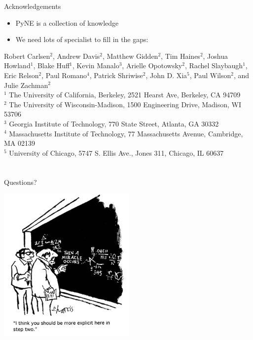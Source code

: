 \documentclass[xcolor=x11names,compress]{beamer}
\renewcommand{\(}{\begin{columns}}
\renewcommand{\)}{\end{columns}}
\newcommand{\<}[1]{\begin{column}{#1}}
\renewcommand{\>}{\end{column}}
\begin{document}
\begin{frame}[fragile]{Acknowledgements}
  \begin{itemize}
      \item PyNE is a collection of knowledge 
      \item We need lots of specialist to fill in the gaps:
  \end{itemize}

\small
  Robert Carlsen$^{2}$,
  Andrew Davis$^{2}$,
  Matthew Gidden$^{2}$,
  Tim Haines$^{2}$,
  Joshua Howland$^{1}$,
  Blake Huff$^{1}$,
  Kevin Manalo$^{3}$,
  Arielle Opotowsky$^{2}$,
  Rachel Slaybaugh$^{1}$,
  Eric Relson$^{2}$,
  Paul Romano$^{4}$,
  Patrick Shriwise$^{2}$,
  John D. Xia$^{5}$,
  Paul Wilson$^{2}$, and
  Julie Zachman$^{2}$ \\    
\vspace{0.2in}
\tiny
 $^{1}$ The University of California, Berkeley, 2521 Hearst Ave, Berkeley, CA 94709 \\
 $^{2}$ The University of Wisconsin-Madison, 1500 Engineering Drive, Madison, WI 53706\\ %
 $^{3}$ Georgia Institute of Technology, 770 State Street, Atlanta, GA 30332\\
 $^{4}$ Massachusetts Institute of Technology, 77 Massachusetts Avenue, Cambridge, MA 02139 \\
 $^{5}$ University of Chicago, 5747 S. Ellis Ave., Jones 311, Chicago, IL 60637\\
  
\end{frame}

\section*{}
\begin{frame}[fragile]{Questions?}

    \begin{center}
    \includegraphics[height=3in,clip]{questions-comic.png}  
    \end{center}
  
\end{frame}
\end{document}
